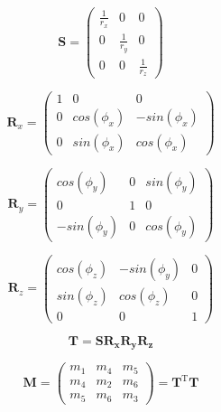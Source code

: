 \documentclass[letterpaper,11pt]{article}
\begin{document}
\begin{equation}
\mathbf{S} =
\begin{pmatrix}
     \frac{1}{r_x} & 0              & 0  \\
     0             & \frac{1}{r_y}  & 0 \\
     0             & 0              & \frac{1}{r_z}
\end{pmatrix}
\label{eq:S}
\end{equation}

\begin{equation}
\mathbf{R}_x =
\begin{pmatrix}
     1 & 0           & 0 \\
     0 & cos(\phi_x) & -sin(\phi_x) \\
     0 & sin(\phi_x) & cos(\phi_x)
\end{pmatrix}
\label{eq:Rx}
\end{equation}

\begin{equation}
\mathbf{R}_y =
\begin{pmatrix}
     cos(\phi_y) & 0    &sin(\phi_y)  \\
     0           & 1    & 0 \\
     -sin(\phi_y)& 0    & cos(\phi_y)
\end{pmatrix}
\label{eq:Ry}
\end{equation}

\begin{equation}
\mathbf{R}_z =
\begin{pmatrix}
     cos(\phi_z) & -sin(\phi_y) & 0  \\
     sin(\phi_z) & cos(\phi_z)  & 0 \\
     0           & 0            & 1
\end{pmatrix}
\label{eq:Rz}
\end{equation}



\begin{equation}
\mathbf{T} = \mathbf{S} \mathbf{R_x} \mathbf{R_y} \mathbf{R_z}
\label{eq:T}
\end{equation}


\begin{equation}
\mathbf{M} = 
\begin{pmatrix}
  m_1 & m_4 & m_5 \\
  m_4 & m_2 & m_6 \\
  m_5 & m_6 & m_3
 \end{pmatrix} = 
\mathbf{T}^{\mathrm{T}} \mathbf{T}
\label{eq:M}
\end{equation}
\end{document}
